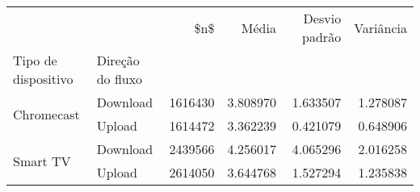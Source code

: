 \begin{tabular}{llrrrr}
\toprule
 &  & \$n\$ & Média & Desvio padrão & Variância \\
Tipo de dispositivo & Direção do fluxo &  &  &  &  \\
\midrule
\multirow[t]{2}{*}{Chromecast} & Download & 1616430 & 3.808970 & 1.633507 & 1.278087 \\
 & Upload & 1614472 & 3.362239 & 0.421079 & 0.648906 \\
\cline{1-6}
\multirow[t]{2}{*}{Smart TV} & Download & 2439566 & 4.256017 & 4.065296 & 2.016258 \\
 & Upload & 2614050 & 3.644768 & 1.527294 & 1.235838 \\
\cline{1-6}
\bottomrule
\end{tabular}
